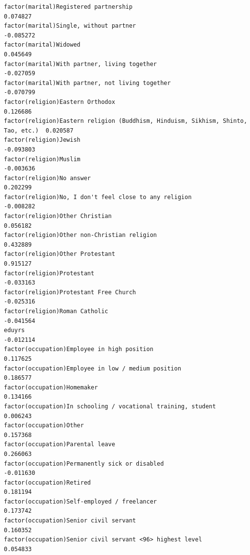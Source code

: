 \documentclass[
]{article}
\begin{document}
\begin{table}
\begin{minipage}[t]{\linewidth}
{\begin{verbatim}
factor(marital)Registered partnership                                              0.074827
factor(marital)Single, without partner                                            -0.085272
factor(marital)Widowed                                                             0.045649
factor(marital)With partner, living together                                      -0.027059
factor(marital)With partner, not living together                                  -0.070799
factor(religion)Eastern Orthodox                                                   0.126686
factor(religion)Eastern religion (Buddhism, Hinduism, Sikhism, Shinto, Tao, etc.)  0.020587
factor(religion)Jewish                                                            -0.093803
factor(religion)Muslim                                                            -0.003636
factor(religion)No answer                                                          0.202299
factor(religion)No, I don't feel close to any religion                            -0.008282
factor(religion)Other Christian                                                    0.056182
factor(religion)Other non-Christian religion                                       0.432889
factor(religion)Other Protestant                                                   0.915127
factor(religion)Protestant                                                        -0.033163
factor(religion)Protestant Free Church                                            -0.025316
factor(religion)Roman Catholic                                                    -0.041564
eduyrs                                                                            -0.012114
factor(occupation)Employee in high position                                        0.117625
factor(occupation)Employee in low / medium position                                0.186577
factor(occupation)Homemaker                                                        0.134166
factor(occupation)In schooling / vocational training, student                      0.006243
factor(occupation)Other                                                            0.157368
factor(occupation)Parental leave                                                   0.266063
factor(occupation)Permanently sick or disabled                                    -0.011630
factor(occupation)Retired                                                          0.181194
factor(occupation)Self-employed / freelancer                                       0.173742
factor(occupation)Senior civil servant                                             0.160352
factor(occupation)Senior civil servant <96> highest level                          0.054833

\end{verbatim}}
\end{minipage}
\end{table}
\end{document}
